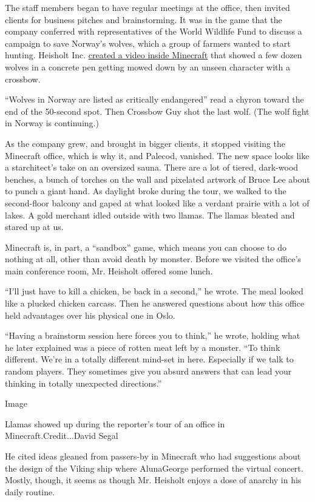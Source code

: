 The staff members began to have regular meetings at the office, then
invited clients for business pitches and brainstorming. It was in the
game that the company conferred with representatives of the World
Wildlife Fund to discuss a campaign to save Norway's wolves, which a
group of farmers wanted to start hunting. Heisholt Inc.
\href{https://www.facebook.com/heisholtas/videos/1740098259647029/}{created
a video inside Minecraft} that showed a few dozen wolves in a concrete
pen getting mowed down by an unseen character with a crossbow.

``Wolves in Norway are listed as critically endangered'' read a chyron
toward the end of the 50-second spot. Then Crossbow Guy shot the last
wolf. (The wolf fight in Norway is continuing.)

As the company grew, and brought in bigger clients, it stopped visiting
the Minecraft office, which is why it, and Palecod, vanished. The new
space looks like a starchitect's take on an oversized sauna. There are a
lot of tiered, dark-wood benches, a bunch of torches on the wall and
pixelated artwork of Bruce Lee about to punch a giant hand. As daylight
broke during the tour, we walked to the second-floor balcony and gaped
at what looked like a verdant prairie with a lot of lakes. A gold
merchant idled outside with two llamas. The llamas bleated and stared up
at us.

Minecraft is, in part, a ``sandbox'' game, which means you can choose to
do nothing at all, other than avoid death by monster. Before we visited
the office's main conference room, Mr. Heisholt offered some lunch.

``I'll just have to kill a chicken, be back in a second,'' he wrote. The
meal looked like a plucked chicken carcass. Then he answered questions
about how this office held advantages over his physical one in Oslo.

``Having a brainstorm session here forces you to think,'' he wrote,
holding what he later explained was a piece of rotten meat left by a
monster. ``To think different. We're in a totally different mind-set in
here. Especially if we talk to random players. They sometimes give you
absurd answers that can lead your thinking in totally unexpected
directions.''

Image

Llamas showed up during the reporter's tour of an office in
Minecraft.Credit...David Segal

He cited ideas gleaned from passers-by in Minecraft who had suggestions
about the design of the Viking ship where AlunaGeorge performed the
virtual concert. Mostly, though, it seems as though Mr. Heisholt enjoys
a dose of anarchy in his daily routine.

